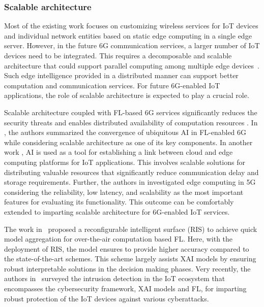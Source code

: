 \documentclass[journal]{IEEEtran}
\begin{document}
\subsubsection{Scalable architecture} 
Most of the existing work focuses on customizing wireless services for IoT devices and individual network entities based on static edge computing in a single edge server. However, in the future 6G communication services, a larger number of IoT devices need to be integrated. This requires a decomposable and scalable architecture that could support parallel computing among multiple edge devices~\cite{guo2018scalable}. Such edge intelligence provided in a distributed manner can support better computation and communication services. For future 6G-enabled IoT applications, the role of scalable architecture is expected to play a crucial role. 

Scalable architecture coupled with FL-based 6G services significantly reduces the security threats and enables distributed availability of computation resources \cite{yang2021federated}. In \cite{xiao2020towards}, the authors summarized the convergence of ubiquitous AI in FL-enabled 6G while considering scalable architecture as one of its key components. In another work \cite{wu2020cloud}, AI is used as a tool for establishing a link between cloud and edge computing platforms for IoT applications. This involves scalable solutions for distributing valuable resources that significantly reduce communication delay and storage requirements. Further, the authors in \cite{rahimi2021design} investigated edge computing in 5G considering the reliability, low latency, and scalability as the most important features for evaluating its functionality. This outcome can be comfortably extended to imparting scalable architecture for 6G-enabled IoT services.

The work in~\cite{wang2021federated} proposed a reconfigurable intelligent surface (RIS) to achieve quick model aggregation for over-the-air computation based FL. Here, with the deployment of RIS, the model ensures to provide higher accuracy compared to the state-of-the-art schemes. This scheme largely assists XAI models by ensuring robust interpretable solutions in the decision making phases. Very recently, the authors in~\cite{arisdakessian2022survey} surveyed the intrusion detection in the IoT ecosystem that encompasses the cybersecurity framework, XAI models and FL, for imparting robust protection of the IoT devices against various cyberattacks.
\end{document}
